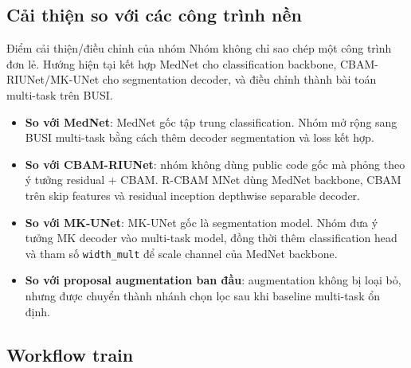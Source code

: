 \documentclass[12pt,a4paper]{article}
\begin{document}
\subsection{Cải thiện so với các công trình nền}

\begin{methodbox}{Điểm cải thiện/điều chỉnh của nhóm}
Nhóm không chỉ sao chép một công trình đơn lẻ. Hướng hiện tại kết hợp MedNet cho classification backbone, CBAM-RIUNet/MK-UNet cho segmentation decoder, và điều chỉnh thành bài toán multi-task trên BUSI.
\end{methodbox}

\begin{itemize}
    \item \textbf{So với MedNet}: MedNet gốc tập trung classification. Nhóm mở rộng sang BUSI multi-task bằng cách thêm decoder segmentation và loss kết hợp.
    \item \textbf{So với CBAM-RIUNet}: nhóm không dùng public code gốc mà phỏng theo ý tưởng residual + CBAM. R-CBAM MNet dùng MedNet backbone, CBAM trên skip features và residual inception depthwise separable decoder.
    \item \textbf{So với MK-UNet}: MK-UNet gốc là segmentation model. Nhóm đưa ý tưởng MK decoder vào multi-task model, đồng thời thêm classification head và tham số \texttt{width\_mult} để scale channel của MedNet backbone.
    \item \textbf{So với proposal augmentation ban đầu}: augmentation không bị loại bỏ, nhưng được chuyển thành nhánh chọn lọc sau khi baseline multi-task ổn định.
\end{itemize}

\subsection{Workflow train}
\end{document}
